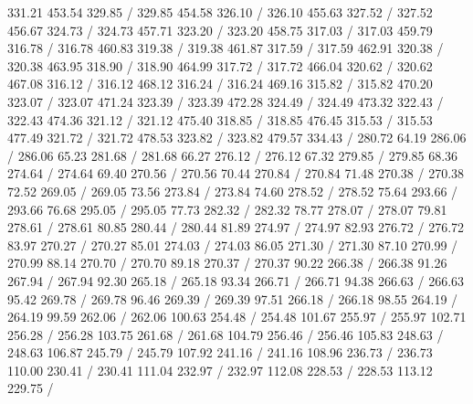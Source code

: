 { 331.21 453.54 329.85 /
 329.85 454.58 326.10 /
 326.10 455.63 327.52 /
 327.52 456.67 324.73 /
 324.73 457.71 323.20 /
 323.20 458.75 317.03 /
 317.03 459.79 316.78 /
 316.78 460.83 319.38 /
 319.38 461.87 317.59 /
 317.59 462.91 320.38 /
 320.38 463.95 318.90 /
 318.90 464.99 317.72 /
 317.72 466.04 320.62 /
 320.62 467.08 316.12 /
 316.12 468.12 316.24 /
 316.24 469.16 315.82 /
 315.82 470.20 323.07 /
 323.07 471.24 323.39 /
 323.39 472.28 324.49 /
 324.49 473.32 322.43 /
 322.43 474.36 321.12 /
 321.12 475.40 318.85 /
 318.85 476.45 315.53 /
 315.53 477.49 321.72 /
 321.72 478.53 323.82 /
 323.82 479.57 334.43 /
\setsolid
{} 280.72 64.19 286.06 /
 286.06 65.23 281.68 /
 281.68 66.27 276.12 /
 276.12 67.32 279.85 /
 279.85 68.36 274.64 /
 274.64 69.40 270.56 /
 270.56 70.44 270.84 /
 270.84 71.48 270.38 /
 270.38 72.52 269.05 /
 269.05 73.56 273.84 /
 273.84 74.60 278.52 /
 278.52 75.64 293.66 /
 293.66 76.68 295.05 /
 295.05 77.73 282.32 /
 282.32 78.77 278.07 /
 278.07 79.81 278.61 /
 278.61 80.85 280.44 /
 280.44 81.89 274.97 /
 274.97 82.93 276.72 /
 276.72 83.97 270.27 /
 270.27 85.01 274.03 /
 274.03 86.05 271.30 /
 271.30 87.10 270.99 /
 270.99 88.14 270.70 /
 270.70 89.18 270.37 /
 270.37 90.22 266.38 /
 266.38 91.26 267.94 /
 267.94 92.30 265.18 /
 265.18 93.34 266.71 /
 266.71 94.38 266.63 /
 266.63 95.42 269.78 /
 269.78 96.46 269.39 /
 269.39 97.51 266.18 /
 266.18 98.55 264.19 /
 264.19 99.59 262.06 /
 262.06 100.63 254.48 /
 254.48 101.67 255.97 /
 255.97 102.71 256.28 /
 256.28 103.75 261.68 /
 261.68 104.79 256.46 /
 256.46 105.83 248.63 /
 248.63 106.87 245.79 /
 245.79 107.92 241.16 /
 241.16 108.96 236.73 /
 236.73 110.00 230.41 /
 230.41 111.04 232.97 /
 232.97 112.08 228.53 /
 228.53 113.12 229.75 /
}
